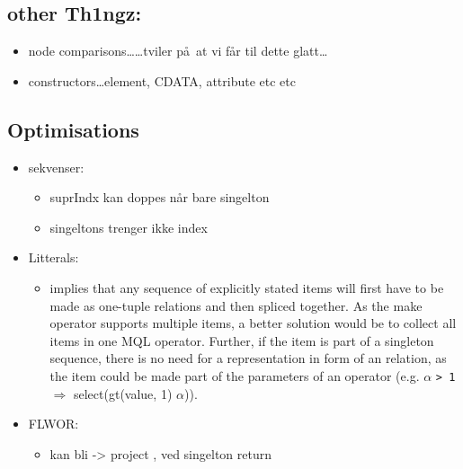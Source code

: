 \subsection{other Th1ngz:}
\begin{itemize}
  \item node comparisons\ldots\ldots tviler p\aa~at vi f\aa r til dette glatt\ldots
  \item constructors\ldots element, CDATA, attribute etc etc
\end{itemize}


\subsection{Optimisations}
\label{sect:trans:TD:optimisations}
\begin{itemize}
  \item sekvenser:
	  \begin{itemize}
	    \item suprIndx kan doppes n\aa r bare singelton
	    \item singeltons trenger ikke index
      \end{itemize} 
  \item Litterals: 
		\begin{itemize}
          \item implies that any sequence of
				explicitly stated items will first have to be made as one-tuple relations and
				then spliced together. As the \textsf{make} operator supports multiple items, a
					better solution would be to collect all items in one MQL operator. Further, if
					the item is part of a singleton sequence, there is no need for a representation
					in form of an relation, as the item could be made part of the parameters of an
					operator (e.g. $\alpha$ \texttt{> 1} $\Longrightarrow$
					\textsf{select(gt(value, 1) $\alpha$)}).   
        \end{itemize}
  \item FLWOR:
  	\begin{itemize}
        \item  kan bli -> project , ved singelton return
      \end{itemize}         
\end{itemize}